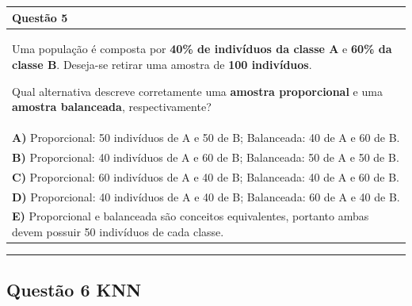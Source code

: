 \documentclass[
]{book}
\begin{document}
\begin{longtable}[]{@{}
  >{\raggedright\arraybackslash}p{}@{}}
\toprule\noalign{}
\begin{minipage}[b]{\linewidth}\raggedright
\textbf{Questão 5}
\end{minipage} \\
\midrule\noalign{}
\endhead
\bottomrule\noalign{}
\endlastfoot
Uma população é composta por \textbf{40\% de indivíduos da classe A} e \textbf{60\% da classe B}. Deseja-se retirar uma amostra de \textbf{100 indivíduos}.

Qual alternativa descreve corretamente uma \textbf{amostra proporcional} e uma \textbf{amostra balanceada}, respectivamente? \\
\textbf{A)} Proporcional: 50 indivíduos de A e 50 de B; Balanceada: 40 de A e 60 de B. \\
\textbf{B)} Proporcional: 40 indivíduos de A e 60 de B; Balanceada: 50 de A e 50 de B. \\
\textbf{C)} Proporcional: 60 indivíduos de A e 40 de B; Balanceada: 40 de A e 60 de B. \\
\textbf{D)} Proporcional: 40 indivíduos de A e 40 de B; Balanceada: 60 de A e 40 de B. \\
\textbf{E)} Proporcional e balanceada são conceitos equivalentes, portanto ambas devem possuir 50 indivíduos de cada classe. \\
\end{longtable}

\begin{center}\rule{0.5\linewidth}{0.5pt}\end{center}

\subsection{Questão 6 KNN}\label{questuxe3o-6-knn}
\end{document}
